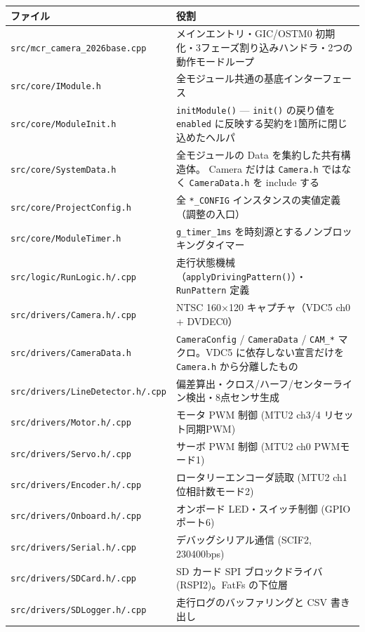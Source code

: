 \documentclass[a4paper,11pt,dvipdfmx]{jsarticle}
\begin{document}
\begin{longtable}{l p{92mm}}
\toprule
\textbf{ファイル} & \textbf{役割} \\
\midrule
\endhead
\texttt{src/mcr\_camera\_2026base.cpp} & メインエントリ・GIC/OSTM0 初期化・3フェーズ割り込みハンドラ・2つの動作モードループ \\
\texttt{src/core/IModule.h}         & 全モジュール共通の基底インターフェース \\
\texttt{src/core/ModuleInit.h}      & \texttt{initModule()} --- \texttt{init()} の戻り値を
  \texttt{enabled} に反映する契約を1箇所に閉じ込めたヘルパ \\
\texttt{src/core/SystemData.h}      & 全モジュールの Data を集約した共有構造体。
  Camera だけは \texttt{Camera.h} ではなく \texttt{CameraData.h} を include する \\
\texttt{src/core/ProjectConfig.h}   & 全 \texttt{*\_CONFIG} インスタンスの実値定義（調整の入口） \\
\texttt{src/core/ModuleTimer.h}     & \texttt{g\_timer\_1ms} を時刻源とするノンブロッキングタイマー \\
\texttt{src/logic/RunLogic.h/.cpp}  & 走行状態機械（\texttt{applyDrivingPattern()}）・\texttt{RunPattern} 定義 \\
\texttt{src/drivers/Camera.h/.cpp}  & NTSC 160$\times$120 キャプチャ（VDC5 ch0 + DVDEC0） \\
\texttt{src/drivers/CameraData.h}   & \texttt{CameraConfig} / \texttt{CameraData} /
  \texttt{CAM\_*} マクロ。VDC5 に依存しない宣言だけを \texttt{Camera.h} から分離したもの \\
\texttt{src/drivers/LineDetector.h/.cpp} & 偏差算出・クロス/ハーフ/センターライン検出・8点センサ生成 \\
\texttt{src/drivers/Motor.h/.cpp}   & モータ PWM 制御 (MTU2 ch3/4 リセット同期PWM) \\
\texttt{src/drivers/Servo.h/.cpp}   & サーボ PWM 制御 (MTU2 ch0 PWMモード1) \\
\texttt{src/drivers/Encoder.h/.cpp} & ロータリーエンコーダ読取 (MTU2 ch1 位相計数モード2) \\
\texttt{src/drivers/Onboard.h/.cpp} & オンボード LED・スイッチ制御 (GPIO ポート6) \\
\texttt{src/drivers/Serial.h/.cpp}  & デバッグシリアル通信 (SCIF2, 230400bps) \\
\texttt{src/drivers/SDCard.h/.cpp}  & SD カード SPI ブロックドライバ (RSPI2)。FatFs の下位層 \\
\texttt{src/drivers/SDLogger.h/.cpp}& 走行ログのバッファリングと CSV 書き出し \\

\end{longtable}
\end{document}

